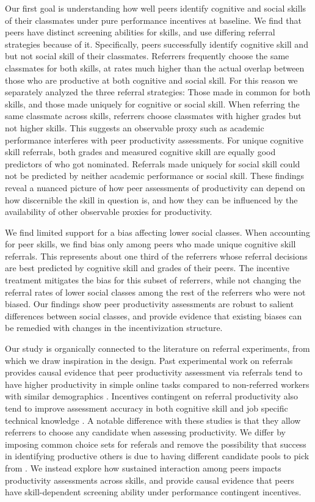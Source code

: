 \documentclass[11pt,a4paper,oneside]{article}
\begin{document}
Our first goal is understanding how well peers identify cognitive and social skills of their classmates under pure performance incentives at baseline. We find that peers have distinct screening abilities for skills, and use differing referral strategies because of it. Specifically, peers successfully identify cognitive skill and but not social skill of their classmates. Referrers frequently choose the same classmates for both skills, at rates much higher than the actual overlap between those who are productive at both cognitive and social skill. For this reason we separately analyzed the three referral strategies: Those made in common for both skills, and those made uniquely for cognitive or social skill. When referring the same classmate across skills, referrers choose classmates with higher grades but not higher skills. This suggests an observable proxy such as academic performance interferes with peer productivity assessments. For unique cognitive skill referrals, both grades and measured cognitive skill are equally good predictors of who got nominated. Referrals made uniquely for social skill could not be predicted by neither academic performance or social skill. These findings reveal a nuanced picture of how peer assessments of productivity can depend on how discernible the skill in question is, and how they can be influenced by the availability of other observable proxies for productivity.

We find limited support for a bias affecting lower social classes. When accounting for peer skills, we find bias only among peers who made unique cognitive skill referrals. This represents about one third of the referrers whose referral decisions are best predicted by cognitive skill and grades of their peers. The incentive treatment mitigates the bias for this subset of referrers, while not changing the referral rates of lower social classes among the rest of the referrers who were not biased. Our findings show peer productivity assessments are robust to salient differences between social classes, and provide evidence that existing biases can be remedied with changes in the incentivization structure.   

Our study is organically connected to the literature on referral experiments, from which we draw inspiration in the design. Past experimental work on referrals provides causal evidence that peer productivity assessment via referrals tend to have higher productivity in simple online tasks compared to non-referred workers with similar demographics \citep{pallais_why_2016}. Incentives contingent on referral productivity also tend to improve assessment accuracy in both cognitive skill and job specific technical knowledge \citep{beaman_who_2012,beaman_job_2018}. A notable difference with these studies is that they allow referrers to choose any candidate when assessing productivity. We differ by imposing common choice sets for referals and remove the possibility that success in identifying productive others is due to having different candidate pools to pick from \citep{montgomery_social_1991}. We instead explore how sustained interaction among peers impacts productivity assessments across skills, and provide causal evidence that peers have skill-dependent screening ability under performance contingent incentives.
\end{document}
